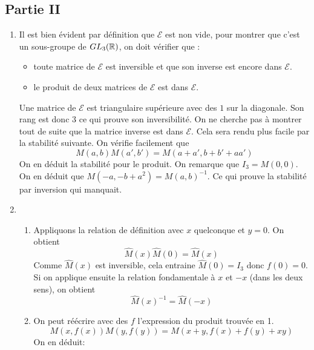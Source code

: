 \subsection*{Partie II}
\begin{enumerate}
 \item Il est bien évident par définition que $\mathcal E$ est non vide, pour montrer que c'est un sous-groupe de $GL_3(\mathbb{R})$, on doit vérifier que :
\begin{itemize}
 \item toute matrice de $\mathcal E$ est inversible et que son inverse est encore dans $\mathcal E$.
\item le produit de deux matrices de $\mathcal E$ est dans $\mathcal E$.
\end{itemize}
Une matrice de $\mathcal E$ est triangulaire supérieure avec des $1$ sur la diagonale. Son rang est donc $3$ ce qui prouve son inversibilité. On ne cherche pas à montrer tout de suite que la matrice inverse est dans $\mathcal E$. Cela sera rendu plus facile par la stabilité suivante.\newline
On vérifie facilement que
\begin{displaymath}
 M(a,b)M(a',b')=M(a+a',b+b'+aa')
\end{displaymath}
On en déduit la stabilité pour le produit.\newline
On remarque que $I_3=M(0,0)$. On en déduit que $M(-a,-b+a^2)=M(a,b)^{-1}$. Ce qui prouve la stabilité par inversion qui manquait.
\item \begin{enumerate}
 \item Appliquons la relation de définition avec $x$ quelconque et $y=0$. On obtient
\begin{displaymath}
 \widehat{M}(x)\widehat{M}(0)= \widehat{M}(x)
\end{displaymath}
Comme $\widehat{M}(x)$ est inversible, cela entraine $\widehat{M}(0)=I_3$ donc $f(0)=0$. Si on applique ensuite la relation fondamentale à $x$ et $-x$ (dans les deux sens), on obtient
\begin{displaymath}
 \widehat{M}(x)^{-1}=\widehat{M}(-x)
\end{displaymath}
\item On peut réécrire avec des $f$ l'expression du produit trouvée en 1.
\begin{displaymath}
 M(x,f(x))M(y,f(y))=M(x+y,f(x)+f(y)+xy)
\end{displaymath}
On en déduit:
\begin{displaymath}

\end{displaymath}
\end{enumerate}
\end{enumerate}
